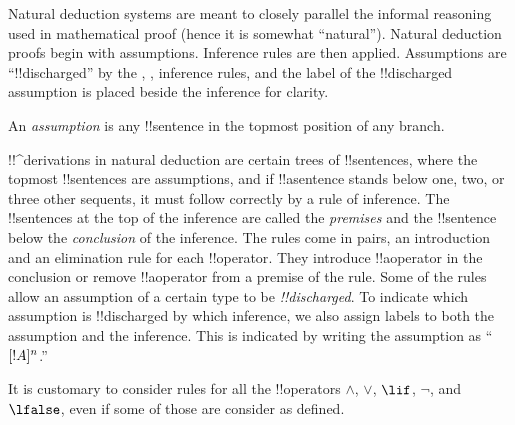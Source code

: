 \documentclass[../../../include/open-logic-section]{subfiles}
\begin{document}
      {}
      {}


\begin{explain}
Natural deduction systems are meant to closely parallel the informal
reasoning used in mathematical proof (hence it is somewhat
``natural''). Natural deduction proofs begin with assumptions.
Inference rules are then applied. Assumptions are ``!!{discharged}''
by the \Intro{\lnot}, \Intro{\lif},  inference rules, and the label of
the !!{discharged} assumption is placed beside the inference for
clarity.
\end{explain}

\begin{defn}[Assumption]
An \emph{assumption} is any !!{sentence}
in the topmost position of any branch.
\end{defn}

!!^{derivation}s in natural deduction are certain trees of
!!{sentence}s, where the topmost !!{sentence}s are assumptions, and if
!!a{sentence} stands below one, two, or three other sequents, it must
follow correctly by a rule of inference. The !!{sentence}s at the top
of the inference are called the \emph{premises} and the !!{sentence}
below the \emph{conclusion} of the inference.  The rules come in
pairs, an introduction and an elimination rule for each
!!{operator}. They introduce !!a{operator} in the conclusion or
remove !!a{operator} from a premise of the rule.  Some of the rules
allow an assumption of a certain type to be \emph{!!{discharged}}. To
indicate which assumption is !!{discharged} by which inference, we
also assign labels to both the assumption and the inference.  This is
indicated by writing the assumption as ``$[!A]^{n}$.''


%
	{It is customary to consider rules for all the !!{operator}s $\land$, $\lor$, $\lif$, $\lnot$, and $\lfalse$, even if some of those are consider as defined.}
\end{document}
